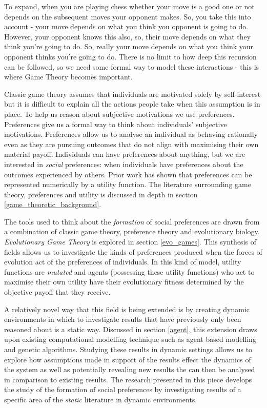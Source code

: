 \documentclass[11pt]{book}
\newcommand*{\np}{\par\noindent\newline}
\begin{document}
\np To expand, when you are playing chess whether your move is a good one or not depends on the subsequent moves your opponent makes. 
So, you take this into account - your move depends on what you think you opponent is going to do.
However, your opponent knows this also, so, their move depends on what they think you're going to do.
So, really your move depends on what you think your opponent thinks you're going to do.
There is no limit to how deep this recursion can be followed, so we need some formal way to model these interactions - this is where Game Theory becomes important.

\np Classic game theory assumes that individuals are motivated solely by self-interest but it is difficult to explain all the actions people take when this assumption is in place.
To help us reason about subjective motivations we use preferences.
Preferences give us a formal way to think about individuals' subjective motivations.
Preferences allow us to analyse an individual as behaving rationally even as they are pursuing outcomes that do not align with maximising their own material payoff.
Individuals can have preferences about anything, but we are interested in \textit{social} preferences: when individuals have preferences about the outcomes experienced by others.
Prior work has shown that preferences can be represented numerically by a utility function.
The literature surrounding game theory, preferences and utility is discussed in depth in section \ref{game_theoretic_background}.

\np The tools used to think about the \textit{formation} of social preferences are drawn from a combination of classic game theory, preference theory and evolutionary biology.
\textit{Evolutionary Game Theory} is explored in section \ref{evo_games}.
This synthesis of fields allows us to investigate the kinds of preferences produced when the forces of evolution act of the preferences of individuals.
In this kind of model, utility functions are \textit{mutated} and agents (possessing these utility functions) who act to maximise their own utility have their evolutionary fitness determined by the objective payoff that they receive.

\np A relatively novel way that this field is being extended is by creating dynamic environments in which to investigate results that have previously only been reasoned about is a static way.
Discussed in section \ref{agent}, this extension draws upon existing computational modelling technique such as agent based modelling and genetic algorithms.
Studying these results in dynamic settings allows us to explore how assumptions made in support of the results effect the dynamics of the system as well as potentially revealing new results the can then be analysed in comparison to existing results.
The research presented in this piece develops the study of the formation of social preferences by investigating results of a specific area of the \textit{static} literature in dynamic environments.
\end{document}
